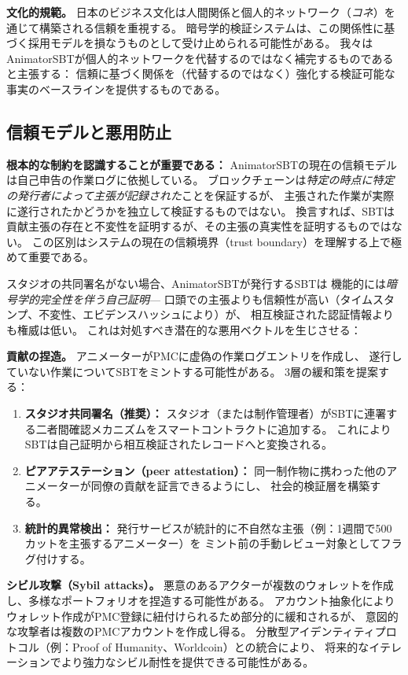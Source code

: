 \textbf{文化的規範。}
日本のビジネス文化は人間関係と個人的ネットワーク（\textit{コネ}）を通じて構築される信頼を重視する。
暗号学的検証システムは、この関係性に基づく採用モデルを損なうものとして受け止められる可能性がある。
我々はAnimatorSBTが個人的ネットワークを代替するのではなく補完するものであると主張する：
信頼に基づく関係を（代替するのではなく）強化する検証可能な事実のベースラインを提供するものである。

\subsection{信頼モデルと悪用防止}
\label{subsec:trust}

\textbf{根本的な制約を認識することが重要である：}
AnimatorSBTの現在の信頼モデルは自己申告の作業ログに依拠している。
ブロックチェーンは\textit{特定の時点に特定の発行者によって主張が記録された}ことを保証するが、
主張された作業が実際に遂行されたかどうかを独立して検証するものではない。
換言すれば、SBTは貢献主張の存在と不変性を証明するが、その主張の真実性を証明するものではない。
この区別はシステムの現在の信頼境界（trust boundary）を理解する上で極めて重要である。

スタジオの共同署名がない場合、AnimatorSBTが発行するSBTは
機能的には\textit{暗号学的完全性を伴う自己証明}---
口頭での主張よりも信頼性が高い（タイムスタンプ、不変性、エビデンスハッシュにより）が、
相互検証された認証情報よりも権威は低い。
これは対処すべき潜在的な悪用ベクトルを生じさせる：

\textbf{貢献の捏造。}
アニメーターがPMCに虚偽の作業ログエントリを作成し、
遂行していない作業についてSBTをミントする可能性がある。
3層の緩和策を提案する：

\begin{enumerate}
  \item \textbf{スタジオ共同署名（推奨）：}
    スタジオ（または制作管理者）がSBTに連署する二者間確認メカニズムをスマートコントラクトに追加する。
    これによりSBTは自己証明から相互検証されたレコードへと変換される。
  \item \textbf{ピアアテステーション（peer attestation）：}
    同一制作物に携わった他のアニメーターが同僚の貢献を証言できるようにし、
    社会的検証層を構築する。
  \item \textbf{統計的異常検出：}
    発行サービスが統計的に不自然な主張（例：1週間で500カットを主張するアニメーター）を
    ミント前の手動レビュー対象としてフラグ付けする。
\end{enumerate}

\textbf{シビル攻撃（Sybil attacks）。}
悪意のあるアクターが複数のウォレットを作成し、多様なポートフォリオを捏造する可能性がある。
アカウント抽象化によりウォレット作成がPMC登録に紐付けられるため部分的に緩和されるが、
意図的な攻撃者は複数のPMCアカウントを作成し得る。
分散型アイデンティティプロトコル（例：Proof of Humanity、Worldcoin）との統合により、
将来的なイテレーションでより強力なシビル耐性を提供できる可能性がある。

